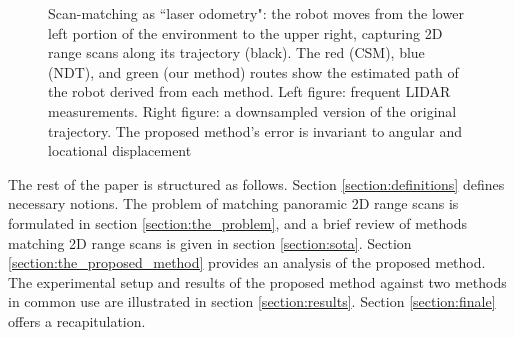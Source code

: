 \begin{figure}[]\centering
  \vspace{-1.7cm}
  
  \vspace{-2.3cm}
  \caption{\small Scan-matching as ``laser odometry": the robot moves from the
           lower left portion of the environment to the upper right, capturing
           2D range scans along its trajectory (black). The red (CSM), blue
           (NDT), and green (our method) routes show the estimated path of the
           robot derived from each method. Left figure: frequent LIDAR
           measurements.  Right figure: a downsampled version of the original
           trajectory. The proposed method's error is invariant to angular and
           locational displacement}
  \label{fig:laser_odometry}
\end{figure}

The rest of the paper is structured as follows. Section
\ref{section:definitions} defines necessary notions.  The problem of matching
panoramic 2D range scans is formulated in section \ref{section:the_problem},
and a brief review of methods matching 2D range scans is given in section
\ref{section:sota}. Section \ref{section:the_proposed_method} provides an
analysis of the proposed method. The experimental setup and results of the
proposed method against two methods in common use are illustrated in section
\ref{section:results}. Section \ref{section:finale} offers a recapitulation.
